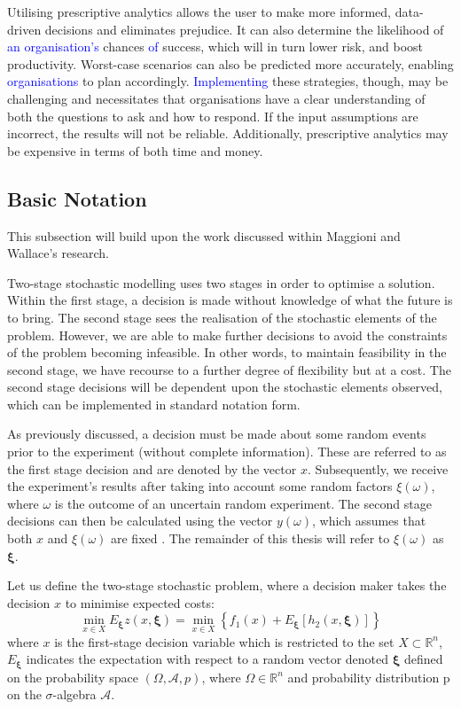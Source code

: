 \documentclass[../thesis.tex]{subfiles}
\begin{document}
{Utilising prescriptive analytics allows the user to make more informed, data-driven decisions and eliminates prejudice. It can also determine the likelihood of \textcolor{blue}{an organisation's} chances \textcolor{blue}{of} success, which will in turn lower risk, and boost productivity. Worst-case scenarios can also be predicted more accurately, enabling \textcolor{blue}{organisations} to plan accordingly. \textcolor{blue}{Implementing} these strategies, though, may be challenging and necessitates that organisations have a clear understanding of both the questions to ask and how to respond. If the input assumptions are incorrect, the results will not be reliable. Additionally, prescriptive analytics may be expensive in terms of both time and money.


\subsection{Basic Notation}
This subsection will build upon the work discussed within Maggioni and Wallace's \cite{Maggioni2010} research. 

Two-stage stochastic modelling uses two stages in order to optimise a solution. Within the first stage, a decision is made without knowledge of what the future is to bring. The second stage sees the realisation of the stochastic elements of the problem. However, we are able to make further decisions to avoid the constraints of the problem becoming infeasible. In other words, to maintain feasibility in the second stage, we have recourse to a further degree of flexibility but at a cost. The second stage decisions will be dependent upon the stochastic elements observed, which can be implemented in standard notation form.

As previously discussed, a decision must be made about some random events prior to the experiment (without complete information). These are referred to as the first stage decision and are denoted by the vector $x$. Subsequently, we receive the experiment's results after taking into account some random factors $\xi(\omega)$, where $\omega$ is the outcome of an uncertain random experiment. The second stage decisions can then be calculated using the vector $y(\omega)$, which assumes that both $x$ and $\xi(\omega)$ are fixed \cite{AndrasPrekopa1995,Birge2011,Ruszczynski2003}. The remainder of this thesis will refer to $\xi(\omega)$ as $\boldsymbol{\xi}$.


Let us define the two-stage stochastic problem, where a decision maker takes the decision $x$ to minimise expected costs:
\begin{equation}\label{eq:firststage}
    \min _{x \in X} E_{\boldsymbol{\xi}} z(x, \boldsymbol{\xi})=\min _{x \in X}\left\{f_1(x)+E_{\boldsymbol{\xi}}\left[h_2(x, \boldsymbol{\xi})\right]\right\}
\end{equation}
where $x$ is the first-stage decision variable which is restricted to the set $X \subset \mathbb{R}^n$, $E_{\boldsymbol{\xi}}$ indicates the expectation with respect to a random vector denoted $\boldsymbol{\xi}$ defined on the probability space $(\Omega, \mathscr{A}, p)$, where $\Omega \in \mathbb{R}^{n}$ and probability distribution p on the $\sigma$-algebra $\mathscr{A}$.

}
\end{document}
